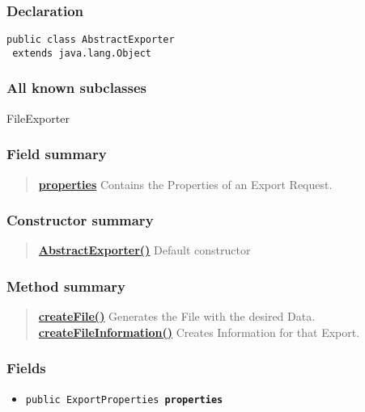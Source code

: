 {{{\subsubsection{Declaration}{
\begin{lstlisting}[frame=none]
public class AbstractExporter
 extends java.lang.Object\end{lstlisting}
\subsubsection{All known subclasses}{FileExporter\small{}}
\subsubsection{Field summary}{
\begin{verse}
\hyperlink{Export.AbstractExporter.properties}{{\bf properties}} Contains the Properties of an Export Request.\\
\end{verse}
}
\subsubsection{Constructor summary}{
\begin{verse}
\hyperlink{Export.AbstractExporter()}{{\bf AbstractExporter()}} Default constructor\\
\end{verse}
}
\subsubsection{Method summary}{
\begin{verse}
\hyperlink{Export.AbstractExporter.createFile()}{{\bf createFile()}} Generates the File with the desired Data.\\
\hyperlink{Export.AbstractExporter.createFileInformation()}{{\bf createFileInformation()}} Creates Information for that Export.\\
\end{verse}
}
\subsubsection{Fields}{
\begin{itemize}
\item{
\label{Export.AbstractExporter.properties}\hypertarget{Export.AbstractExporter.properties}{\texttt{public ExportProperties\ {\bf  properties}}
}
}
\end{itemize}
}
}}}}
